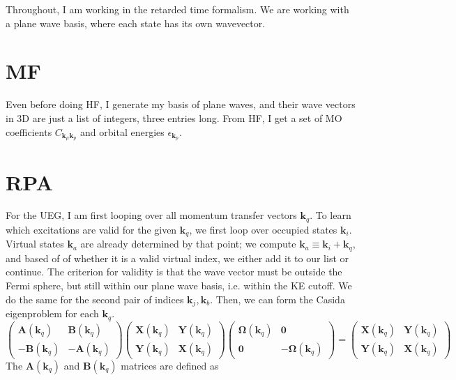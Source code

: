 Throughout, I am working in the retarded time formalism. We are working with a plane wave basis, where each state has its own wavevector.
\section{MF}
Even before doing HF, I generate my basis of plane waves, and their wave vectors in 3D are just a list of integers, three entries long. From HF, I get a set of MO coefficients $C_{\bm{k}_\mu \bm{k}_p}$ and orbital energies $\epsilon_{\bm{k}_p}$.
\section{RPA}
For the UEG, I am first looping over all momentum transfer vectors $\bm{k}_q$. To learn which excitations are valid for the given $\bm{k}_q$, we first loop over occupied states $\bm{k}_i$. Virtual states $\bm{k}_a$ are already determined by that point; we compute $\bm{k}_a \equiv \bm{k}_i + \bm{k}_q$, and based of of whether it is a valid virtual index, we either add it to our list or continue. The criterion for validity is that the wave vector must be outside the Fermi sphere, but still within our plane wave basis, i.e. within the KE cutoff. We do the same for the second pair of indices $\bm{k}_j, \bm{k}_b$. Then, we can form the Casida eigenproblem for each $\bm{k}_q$.
\begin{equation}
    \begin{pmatrix}
        \bm{A}(\bm{k}_q) & \bm{B}(\bm{k}_q) \\
        -\bm{B}(\bm{k}_q) & -\bm{A}(\bm{k}_q)
    \end{pmatrix}
    \begin{pmatrix}
        \bm{X}(\bm{k}_q) & \bm{Y}(\bm{k}_q) \\
        \bm{Y}(\bm{k}_q) & \bm{X}(\bm{k}_q)
    \end{pmatrix}
    \begin{pmatrix}
        \bm{\Omega}(\bm{k}_q) & \bm{0} \\
        \bm{0} & -\bm{\Omega}(\bm{k}_q)
    \end{pmatrix}
    = \begin{pmatrix}
        \bm{X}(\bm{k}_q) & \bm{Y}(\bm{k}_q) \\
        \bm{Y}(\bm{k}_q) & \bm{X}(\bm{k}_q)
    \end{pmatrix}
    \label{eqn:casida_eq}
\end{equation}
The $\bm{A}(\bm{k}_q)$ and $\bm{B}(\bm{k}_q)$ matrices are defined as
